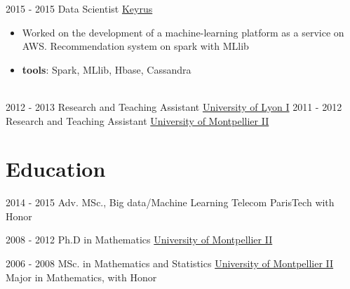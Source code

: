 \documentclass[letterpaper]{twentysecondcv} %
\begin{document}
\begin{twenty}
     \twentyitem
   		{2015 - 2015}
		{}
        {Data Scientist}
        {\href{http://www.keyrus.com/}{Keyrus}}
        {}
        {
        \begin{itemize}
        \item Worked on the development of a machine-learning platform as a service on AWS. Recommendation system on spark with MLlib
				\item \textbf{tools}: Spark, MLlib, Hbase, Cassandra
    \end{itemize} }\\
		
	\twentyitem
   		{2012 - 2013}
		{}
        {Research and Teaching Assistant}
        {\href{http://www.univ-lyon1.fr/}{University of Lyon I}}
        {}
        {}
	\twentyitem
   		{2011 - 2012}
		{}
        {Research and Teaching Assistant}
        {\href{http://www.umontpellier.fr/}{University of Montpellier II}}
        {}
        {}
        
\end{twenty}





\section{Education}{\faGraduationCap}

\begin{twenty} %
	\twentyitemshorttest
    	{2014 - 2015}
        {}
        {Adv. MSc., Big data/Machine Learning}
        {Telecom ParisTech}
        {with Honor}
				
	\twentyitemshorttest
    	{2008 - 2012}
		{}
        {Ph.D in Mathematics}
        {\href{http://www.umontpellier.fr/}{University of Montpellier II}}
        {}
				
	\twentyitemshorttest
    	{2006 - 2008}
		{}
        {MSc. in Mathematics and Statistics}
        {\href{http://www.umontpellier.fr/}{University of Montpellier II}}
        {Major in Mathematics, with Honor}
\end{twenty}
\end{document}

